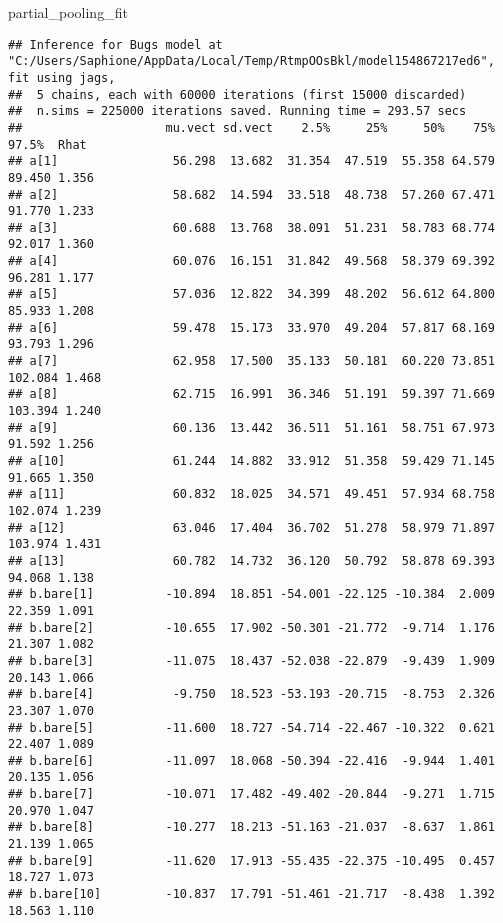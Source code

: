 \documentclass[
]{article}
\newenvironment{Shaded}{\begin{snugshade}}{\end{snugshade}}
\newcommand{\NormalTok}[1]{#1}
\begin{document}
\begin{Shaded}
\begin{Highlighting}[]
\NormalTok{partial\_pooling\_fit}
\end{Highlighting}
\end{Shaded}

\begin{verbatim}
## Inference for Bugs model at "C:/Users/Saphione/AppData/Local/Temp/RtmpOOsBkl/model154867217ed6", fit using jags,
##  5 chains, each with 60000 iterations (first 15000 discarded)
##  n.sims = 225000 iterations saved. Running time = 293.57 secs
##                    mu.vect sd.vect    2.5%     25%     50%    75%   97.5%  Rhat
## a[1]                56.298  13.682  31.354  47.519  55.358 64.579  89.450 1.356
## a[2]                58.682  14.594  33.518  48.738  57.260 67.471  91.770 1.233
## a[3]                60.688  13.768  38.091  51.231  58.783 68.774  92.017 1.360
## a[4]                60.076  16.151  31.842  49.568  58.379 69.392  96.281 1.177
## a[5]                57.036  12.822  34.399  48.202  56.612 64.800  85.933 1.208
## a[6]                59.478  15.173  33.970  49.204  57.817 68.169  93.793 1.296
## a[7]                62.958  17.500  35.133  50.181  60.220 73.851 102.084 1.468
## a[8]                62.715  16.991  36.346  51.191  59.397 71.669 103.394 1.240
## a[9]                60.136  13.442  36.511  51.161  58.751 67.973  91.592 1.256
## a[10]               61.244  14.882  33.912  51.358  59.429 71.145  91.665 1.350
## a[11]               60.832  18.025  34.571  49.451  57.934 68.758 102.074 1.239
## a[12]               63.046  17.404  36.702  51.278  58.979 71.897 103.974 1.431
## a[13]               60.782  14.732  36.120  50.792  58.878 69.393  94.068 1.138
## b.bare[1]          -10.894  18.851 -54.001 -22.125 -10.384  2.009  22.359 1.091
## b.bare[2]          -10.655  17.902 -50.301 -21.772  -9.714  1.176  21.307 1.082
## b.bare[3]          -11.075  18.437 -52.038 -22.879  -9.439  1.909  20.143 1.066
## b.bare[4]           -9.750  18.523 -53.193 -20.715  -8.753  2.326  23.307 1.070
## b.bare[5]          -11.600  18.727 -54.714 -22.467 -10.322  0.621  22.407 1.089
## b.bare[6]          -11.097  18.068 -50.394 -22.416  -9.944  1.401  20.135 1.056
## b.bare[7]          -10.071  17.482 -49.402 -20.844  -9.271  1.715  20.970 1.047
## b.bare[8]          -10.277  18.213 -51.163 -21.037  -8.637  1.861  21.139 1.065
## b.bare[9]          -11.620  17.913 -55.435 -22.375 -10.495  0.457  18.727 1.073
## b.bare[10]         -10.837  17.791 -51.461 -21.717  -8.438  1.392  18.563 1.110

\end{verbatim}
\end{document}
